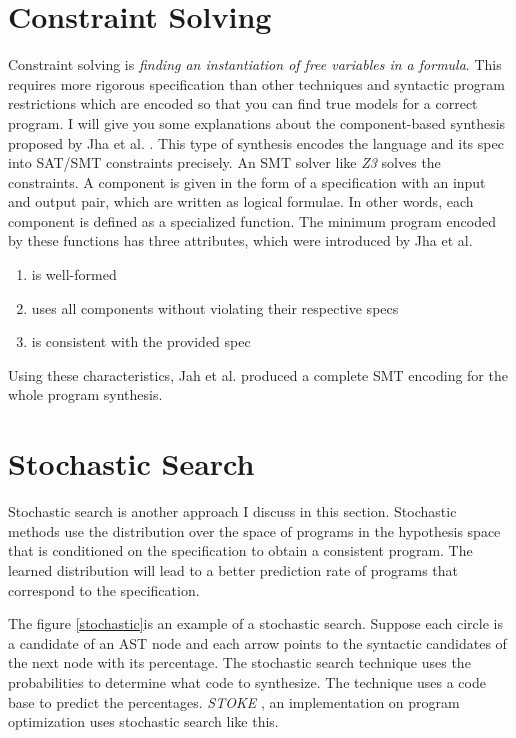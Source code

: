 \documentclass[12pt, a4paper, titlepage]{report}
\begin{document}
  \section{Constraint Solving}
    Constraint solving is \textit{finding an instantiation of free variables in a formula}. This requires more rigorous specification than other techniques and syntactic program restrictions which are encoded so that you can find true models for a correct program.
    I will give you some explanations about the component-based synthesis proposed by Jha et al. \cite{jha:2010}.
    This type of synthesis encodes the language and its spec into SAT/SMT constraints precisely.
    An SMT solver like \textit{Z3} \cite{moura:2008} solves the constraints.
    A component is given in the form of a specification with an input and output pair, which are written as logical formulae.
    In other words, each component is defined as a specialized function.
    The minimum program encoded by these functions has three attributes, which were introduced by Jha et al.
    \begin{enumerate}
        \item is well-formed
        \item uses all components without violating their respective specs
        \item is consistent with the provided spec
    \end{enumerate}
    Using these characteristics, Jah et al. produced a complete SMT encoding for the whole program synthesis.

  \section{Stochastic Search}
    Stochastic search is another approach I discuss in this section.
    Stochastic methods use the distribution over the space of programs in the hypothesis space that is conditioned on the specification to obtain a consistent program.
    The learned distribution will lead to a better prediction rate of programs that correspond to the specification.

    The figure \ref{stochastic}is an example of a stochastic search.
    Suppose each circle is a candidate of an AST node and each arrow points to the syntactic candidates of the next node with its percentage.
    The stochastic search technique uses the probabilities to determine what code to synthesize.
    The technique uses a code base to predict the percentages.
    \textit{STOKE} \cite{Schkufza:2016}, an implementation on program optimization uses stochastic search like this.
\end{document}
